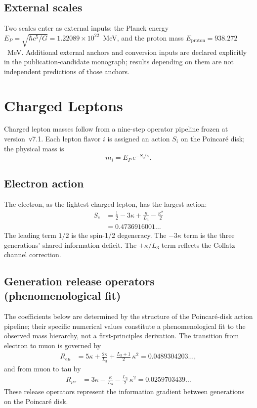 \documentclass[aps,prd,reprint,twocolumn,showpacs,superscriptaddress]{revtex4-2}
\begin{document}
\subsection{External scales}

Two scales enter as external inputs: the Planck energy
$E_P = \sqrt{\hbar c^5 / G} = 1.22089 \times 10^{22}$~MeV, and the
proton mass $E_{\text{proton}} = 938.272$~MeV.  Additional external anchors and conversion inputs are declared explicitly in the
publication-candidate monograph; results depending on them are not independent
predictions of those anchors.

\section{Charged Leptons}
\label{sec:leptons}

Charged lepton masses follow from a nine-step operator pipeline frozen
at version~v7.1.  Each lepton flavor $i$ is assigned an action
$S_i$ on the Poincar\'{e} disk; the physical mass is
\begin{equation}
m_i = E_P \, e^{-S_i / \kappa}.
\label{eq:mass_from_action}
\end{equation}

\subsection{Electron action}

The electron, as the lightest charged lepton, has the largest action:
\begin{align}
S_e &= \frac12 - 3\kappa + \frac{\kappa}{L_3} - \frac{\kappa^2}{2} \\
    &= 0.4736916001 \ldots
\label{eq:S_e}
\end{align}
The leading term $1/2$ is the spin-1/2 degeneracy.  The $-3\kappa$ term
is the three generations' shared information deficit.  The
$+\kappa/L_3$ term reflects the Collatz channel correction.

\subsection{Generation release operators (phenomenological fit)}

The coefficients below are determined by the structure of the
Poincar\'{e}-disk action pipeline; their specific numerical values
constitute a phenomenological fit to the observed mass hierarchy,
not a first-principles derivation.  The transition from electron to
muon is governed by
\begin{align}
R_{e\mu} &= 5\kappa + \frac{2\kappa}{L_3} +
\frac{L_3 + 1}{2}\,\kappa^2 = 0.0489304203\ldots,
\label{eq:R_em}
\end{align}
and from muon to tau by
\begin{align}
R_{\mu\tau} &= 3\kappa - \frac{\kappa}{L_3} -
\frac{L_3}{2}\,\kappa^2 = 0.0259703439\ldots
\label{eq:R_mt}
\end{align}
These release operators represent the information gradient between
generations on the Poincar\'{e} disk.
\end{document}
